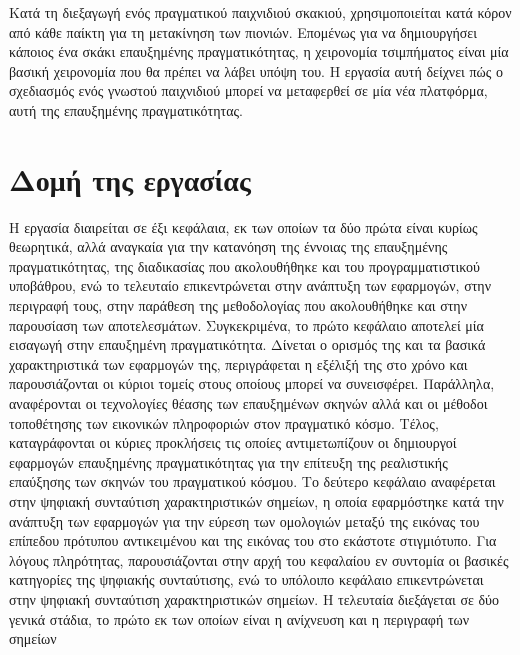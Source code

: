 Κατά τη διεξαγωγή ενός πραγματικού παιχνιδιού σκακιού, χρησιμοποιείται κατά κόρον από κάθε παίκτη για τη μετακίνηση των πιονιών. Επομένως για να δημιουργήσει κάποιος ένα σκάκι επαυξημένης πραγματικότητας, η χειρονομία τσιμπήματος είναι μία βασική χειρονομία που θα πρέπει να λάβει υπόψη του. Η εργασία αυτή δείχνει πώς ο σχεδιασμός ενός γνωστού παιχνιδιού μπορεί να μεταφερθεί σε μία νέα πλατφόρμα, αυτή της επαυξημένης πραγματικότητας.







\section{Δομή της εργασίας}
Η εργασία διαιρείται σε έξι κεφάλαια, εκ των οποίων τα δύο πρώτα είναι κυρίως θεωρητικά, αλλά αναγκαία για την κατανόηση της έννοιας της επαυξημένης πραγματικότητας, της διαδικασίας που ακολουθήθηκε και του προγραμματιστικού υποβάθρου, ενώ το τελευταίο επικεντρώνεται στην ανάπτυξη των εφαρμογών, στην περιγραφή τους, στην παράθεση της μεθοδολογίας που ακολουθήθηκε και στην παρουσίαση των αποτελεσμάτων.
Συγκεκριμένα, το πρώτο κεφάλαιο αποτελεί μία εισαγωγή στην επαυξημένη πραγματικότητα.
Δίνεται ο ορισμός της και τα βασικά χαρακτηριστικά των εφαρμογών της, περιγράφεται η εξέλιξή της στο χρόνο και παρουσιάζονται οι κύριοι τομείς στους οποίους μπορεί να συνεισφέρει. Παράλληλα, αναφέρονται οι τεχνολογίες θέασης των επαυξημένων σκηνών αλλά και οι μέθοδοι τοποθέτησης των εικονικών πληροφοριών στον πραγματικό κόσμο. Τέλος, καταγράφονται οι κύριες προκλήσεις τις οποίες αντιμετωπίζουν οι δημιουργοί εφαρμογών επαυξημένης πραγματικότητας για την επίτευξη της ρεαλιστικής επαύξησης των σκηνών του πραγματικού κόσμου.
Το δεύτερο κεφάλαιο αναφέρεται στην ψηφιακή συνταύτιση χαρακτηριστικών σημείων, η οποία εφαρμόστηκε κατά την ανάπτυξη των εφαρμογών για την εύρεση των ομολογιών μεταξύ της εικόνας του επίπεδου πρότυπου αντικειμένου και της εικόνας του στο εκάστοτε στιγμιότυπο. Για λόγους πληρότητας, παρουσιάζονται στην αρχή του κεφαλαίου εν συντομία οι βασικές κατηγορίες της ψηφιακής συνταύτισης, ενώ το υπόλοιπο κεφάλαιο επικεντρώνεται στην ψηφιακή συνταύτιση χαρακτηριστικών σημείων. Η τελευταία διεξάγεται σε δύο γενικά στάδια, το πρώτο εκ των οποίων είναι η ανίχνευση και η περιγραφή των σημείων

